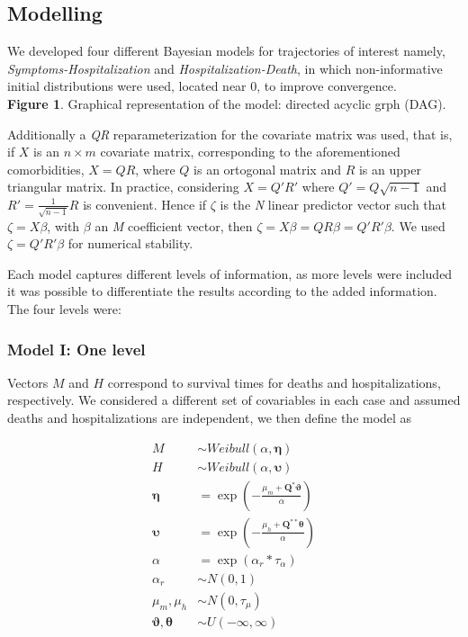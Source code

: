 \documentclass[10pt,letterpaper]{article}
\begin{document}
\hypertarget{modelling}{%
\subsection{Modelling}\label{modelling}}

We developed four different Bayesian models for trajectories of interest
namely, \emph{Symptoms-Hospitalization} and
\emph{Hospitalization-Death}, in which non-informative initial
distributions were used, located near \(0\), to improve convergence.
\\


\textbf{Figure 1}. Graphical representation of the model: directed acyclic grph (DAG).


Additionally a \textit{QR} reparameterization for the covariate matrix
was used, that is, if \(X\) is an \(n \times m\) covariate matrix,
corresponding to the aforementioned comorbidities, \(X=QR\), where \(Q\)
is an ortogonal matrix and \(R\) is an upper triangular matrix. In
practice, considering \(X=Q'R'\) where \(Q'=Q\sqrt{n-1}\) and
\(R'=\frac{1}{\sqrt{n-1}}R\) is convenient. Hence if \(\zeta\) is the
\textit{N} linear predictor vector such that \(\zeta=X\beta\), with
\(\beta\) an \textit{M} coefficient vector, then
\(\zeta=X\beta=QR\beta=Q'R'\beta\). We used \(\zeta=Q'R'\beta\) for
numerical stability.

Each model captures different levels of information, as more levels were included it
was possible to differentiate the results according to the added information. The four levels  were:




\hypertarget{model-i-one-level}{%
\subsubsection{Model I: One level}\label{model-i-one-level}}

Vectors \(M\) and \(H\) correspond to  survival times 
for deaths and hospitalizations, respectively. We considered a different
set of covariables in each case and assumed deaths and
hospitalizations are independent, we then define the model as

\[
\begin{aligned}
 {M}  &\sim Weibull(\alpha,\mathbf{\eta})\\
 {H}  &\sim Weibull(\alpha,\mathbf{\upsilon}) \\
 \mathbf{\eta} &= \exp\left(-\frac{\mu_m+\mathbf{Q}^*\mathbf{\vartheta}}{\alpha}\right) \\
 \mathbf{\upsilon} &= \exp\left(-\frac{\mu_h+\mathbf{Q}^{**}\mathbf{\theta}}{\alpha}\right) \\
 \alpha&=\exp(\alpha_r*\tau_\alpha) \\
 \alpha_r&\sim N(0,1) \\
 \mu_m,\mu_h &\sim N(0,\tau_\mu) \\
 \mathbf{\vartheta},\mathbf{\theta} &\sim U(-\infty,\infty) \\
\end{aligned}
\]
\end{document}
